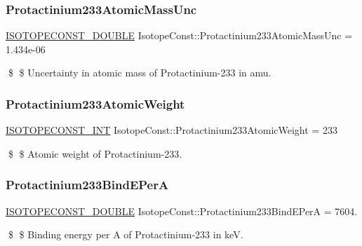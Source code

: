 \subsubsection{\texorpdfstring{Protactinium233\+Atomic\+Mass\+Unc}{Protactinium233AtomicMassUnc}}
{\footnotesize\ttfamily \mbox{\hyperlink{group___isotope_const-_macros_ga8f45a7272ce02c0b4c65c44636ed719a}{I\+S\+O\+T\+O\+P\+E\+C\+O\+N\+S\+T\+\_\+\+D\+O\+U\+B\+LE}} Isotope\+Const\+::\+Protactinium233\+Atomic\+Mass\+Unc = 1.\+434e-\/06}

\$ \$ Uncertainty in atomic mass of Protactinium-\/233 in amu. \mbox{\label{group___isotope_const-_protactinium-_pa233_ga519fa50211c0757804bed8f42f857d1c}} 
\subsubsection{\texorpdfstring{Protactinium233\+Atomic\+Weight}{Protactinium233AtomicWeight}}
{\footnotesize\ttfamily \mbox{\hyperlink{group___isotope_const-_macros_ga5f18360b3e99483a35c32d789e62621c}{I\+S\+O\+T\+O\+P\+E\+C\+O\+N\+S\+T\+\_\+\+I\+NT}} Isotope\+Const\+::\+Protactinium233\+Atomic\+Weight = 233}

\$ \$ Atomic weight of Protactinium-\/233. \mbox{\label{group___isotope_const-_protactinium-_pa233_gac435b470cad8e614c608e769676a1dcf}} 
\subsubsection{\texorpdfstring{Protactinium233\+Bind\+E\+PerA}{Protactinium233BindEPerA}}
{\footnotesize\ttfamily \mbox{\hyperlink{group___isotope_const-_macros_ga8f45a7272ce02c0b4c65c44636ed719a}{I\+S\+O\+T\+O\+P\+E\+C\+O\+N\+S\+T\+\_\+\+D\+O\+U\+B\+LE}} Isotope\+Const\+::\+Protactinium233\+Bind\+E\+PerA = 7604.}

\$ \$ Binding energy per A of Protactinium-\/233 in keV. \mbox{\label{group___isotope_const-_protactinium-_pa233_ga8d52215163ba009e1645a5868f34aca8}} 
